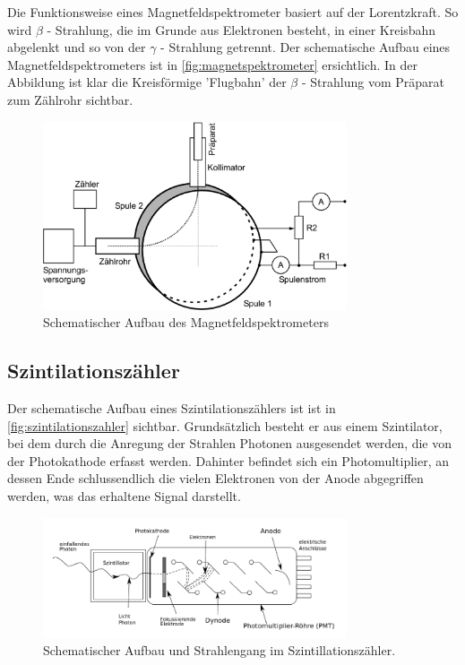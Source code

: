 \documentclass[12pt,english,ngerman]{scrartcl}
\begin{document}
Die Funktionsweise eines Magnetfeldspektrometer basiert auf der Lorentzkraft.
So wird \(\beta\) - Strahlung, die im Grunde aus Elektronen besteht, in einer
Kreisbahn abgelenkt und so von der \(\gamma\) - Strahlung getrennt. Der
schematische Aufbau eines Magnetfeldspektrometers ist in
\autoref{fig:magnetspektrometer} ersichtlich. In der Abbildung ist klar die
Kreisförmige 'Flugbahn' der \(\beta\) - Strahlung vom Präparat zum Zählrohr
sichtbar.\cite[]{demex2}

\begin{figure}[H]
	\begin{center}
		\includegraphics[width = 0.8\textwidth]{./figures/fig5.png}
	\end{center}
	\caption{
		Schematischer Aufbau des
		Magnetfeldspektrometers~\cite[]{zaehlrohrvorbereitung}
	}\label{fig:magnetspektrometer}
\end{figure}

\subsection{Szintilationszähler}

Der schematische Aufbau eines Szintilationszählers ist ist in
\autoref{fig:szintilationszahler} sichtbar. Grundsätzlich besteht er aus einem
Szintilator, bei dem durch die Anregung der Strahlen Photonen ausgesendet
werden, die von der Photokathode erfasst werden. Dahinter befindet sich ein
Photomultiplier, an dessen Ende schlussendlich die vielen Elektronen von der
Anode abgegriffen werden, was das erhaltene Signal darstellt.\cite{gerthsen}

\begin{figure}[H]
	\begin{center}
		\includegraphics[width = 0.8\textwidth]{./figures/szintilationszahler.png}
	\end{center}
	\caption{
		Schematischer Aufbau und
		Strahlengang im Szintillationszähler.~\cite[]{zaehlrohrvorbereitung}
	}\label{fig:szintilationszahler}
\end{figure}
\end{document}

